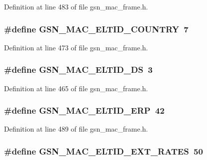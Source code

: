 Definition at line 483 of file gsn\_\-mac\_\-frame.h.

\hypertarget{a00523_aa407ce89828edf1afbbe91d68a52bb07}{
\subsubsection[{GSN\_\-MAC\_\-ELTID\_\-COUNTRY}]{\setlength{\rightskip}{0pt plus 5cm}\#define GSN\_\-MAC\_\-ELTID\_\-COUNTRY~7}}
\label{a00523_aa407ce89828edf1afbbe91d68a52bb07}


Definition at line 473 of file gsn\_\-mac\_\-frame.h.

\hypertarget{a00523_a5b7b7c6ca167623275bdfab4be83bce8}{
\subsubsection[{GSN\_\-MAC\_\-ELTID\_\-DS}]{\setlength{\rightskip}{0pt plus 5cm}\#define GSN\_\-MAC\_\-ELTID\_\-DS~3}}
\label{a00523_a5b7b7c6ca167623275bdfab4be83bce8}


Definition at line 465 of file gsn\_\-mac\_\-frame.h.

\hypertarget{a00523_a3f4d39075c8372bd6e0f5cd0071b1f5d}{
\subsubsection[{GSN\_\-MAC\_\-ELTID\_\-ERP}]{\setlength{\rightskip}{0pt plus 5cm}\#define GSN\_\-MAC\_\-ELTID\_\-ERP~42}}
\label{a00523_a3f4d39075c8372bd6e0f5cd0071b1f5d}


Definition at line 489 of file gsn\_\-mac\_\-frame.h.

\hypertarget{a00523_aeb35925f7906a350f79f167a80c5c322}{
\subsubsection[{GSN\_\-MAC\_\-ELTID\_\-EXT\_\-RATES}]{\setlength{\rightskip}{0pt plus 5cm}\#define GSN\_\-MAC\_\-ELTID\_\-EXT\_\-RATES~50}}
\label{a00523_aeb35925f7906a350f79f167a80c5c322}


